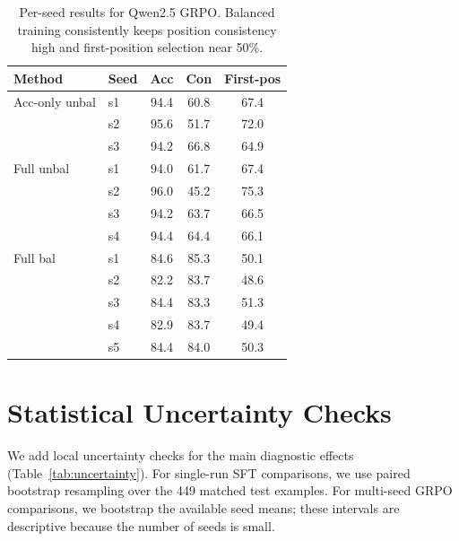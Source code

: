\documentclass[letterpaper]{article}
\newcommand{\multirow}[3]{#3}
\begin{document}
\begin{table}[htbp]
\centering
\scriptsize
\begin{tabular}{llccc}
\toprule
\textbf{Method} & \textbf{Seed} & \textbf{Acc} & \textbf{Con} & \textbf{First-pos} \\
\midrule
\multirow{3}{*}{Acc-only unbal} & s1 & 94.4 & 60.8 & 67.4 \\
 & s2 & 95.6 & 51.7 & 72.0 \\
 & s3 & 94.2 & 66.8 & 64.9 \\
\midrule
\multirow{4}{*}{Full unbal} & s1 & 94.0 & 61.7 & 67.4 \\
 & s2 & 96.0 & 45.2 & 75.3 \\
 & s3 & 94.2 & 63.7 & 66.5 \\
 & s4 & 94.4 & 64.4 & 66.1 \\
\midrule
\multirow{5}{*}{Full bal} & s1 & 84.6 & 85.3 & 50.1 \\
 & s2 & 82.2 & 83.7 & 48.6 \\
 & s3 & 84.4 & 83.3 & 51.3 \\
 & s4 & 82.9 & 83.7 & 49.4 \\
 & s5 & 84.4 & 84.0 & 50.3 \\
\bottomrule
\end{tabular}
\caption{Per-seed results for Qwen2.5 GRPO. Balanced training consistently keeps position consistency high and first-position selection near 50\%.}
\label{tab:seeds}
\end{table}

\section{Statistical Uncertainty Checks}
\label{app:uncertainty}

We add local uncertainty checks for the main diagnostic effects (Table~\ref{tab:uncertainty}). For single-run SFT comparisons, we use paired bootstrap resampling over the 449 matched test examples. For multi-seed GRPO comparisons, we bootstrap the available seed means; these intervals are descriptive because the number of seeds is small.
\end{document}
